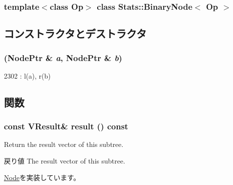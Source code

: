 \subsubsection*{template$<$class Op$>$ class Stats::BinaryNode$<$ Op $>$}



\subsection{コンストラクタとデストラクタ}
\hypertarget{classStats_1_1BinaryNode_ac16f666cd797937f986fa7ed3530dc69}{
\subsubsection[{BinaryNode}]{ ({\bf NodePtr} \& {\em a}, \/  {\bf NodePtr} \& {\em b})}}
\label{classStats_1_1BinaryNode_ac16f666cd797937f986fa7ed3530dc69}



\begin{DoxyCode}
2302 : l(a), r(b) {}
\end{DoxyCode}


\subsection{関数}
\hypertarget{classStats_1_1BinaryNode_aba312f9e3431b1652f8b3ddf3fe105dc}{
\subsubsection[{result}]{\setlength{\rightskip}{0pt plus 5cm}const {\bf VResult}\& result () const}}
\label{classStats_1_1BinaryNode_aba312f9e3431b1652f8b3ddf3fe105dc}
Return the result vector of this subtree. \begin{DoxyReturn}{戻り値}
The result vector of this subtree. 
\end{DoxyReturn}


\hyperlink{classStats_1_1Node_a7fcf57115122663db42f39cc18ca0f62}{Node}を実装しています。


